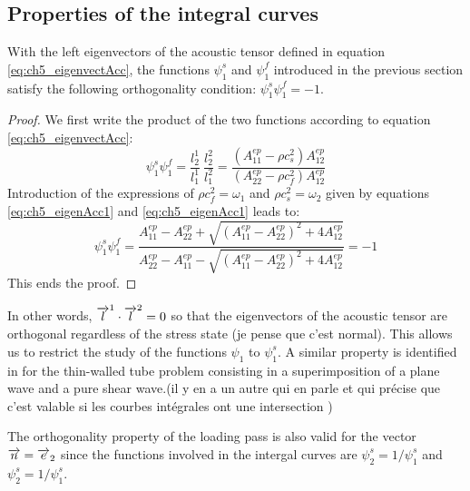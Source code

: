 \subsection{Properties of the integral curves}
With the left eigenvectors of the acoustic tensor defined in equation \eqref{eq:ch5_eigenvectAcc}, the functions $\psi^s_1$ and $\psi^f_1$ introduced in the previous section satisfy the following orthogonality condition: $\psi^s_1\psi^f_1=-1$. 

\begin{proof}
  We first write the product of the two functions according to equation \eqref{eq:ch5_eigenvectAcc}:
  \begin{equation*}
    \psi^s_1\psi^f_1 = \frac{l^1_2}{l^1_1}\: \frac{l_2^2}{l^2_1} = \frac{(A_{11}^{ep}-\rho c_s^2)A^{ep}_{12}}{(A_{22}^{ep}-\rho c_f^2)A^{ep}_{12}}
  \end{equation*}
  Introduction of the expressions of $\rho c_f^2 = \omega_1$ and $\rho c_s^2 = \omega_2$ given by equations \eqref{eq:ch5_eigenAcc1} and \eqref{eq:ch5_eigenAcc1} leads to:
  \begin{equation*}
    \psi^s_1\psi^f_1 = \frac{A_{11}^{ep}-A_{22}^{ep}+\sqrt{(A_{11}^{ep}-A_{22}^{ep})^2 + 4A_{12}^{ep}}}{A_{22}^{ep}-A_{11}^{ep}-\sqrt{(A_{11}^{ep}-A_{22}^{ep})^2 + 4A_{12}^{ep}}}=-1
  \end{equation*}
  This ends the proof.
\end{proof}
In other words, ${\overrightarrow{l}}^1 \cdot {\overrightarrow{l}}^2=0$ so that the eigenvectors of the acoustic tensor are orthogonal regardless of the stress state (je pense que c'est normal). This allows us to restrict the study of the functions $\psi_1$ to $\psi^s_1$.
A similar property is identified in \cite{Clifton} for the thin-walled tube problem consisting in a superimposition of a plane wave and a pure shear wave.(il y en a un autre qui en parle et qui précise que c'est valable si les courbes intégrales ont une intersection \cite[p.13]{Ting68})
\begin{remark}
  The orthogonality property of the loading pass is also valid for the vector ${\overrightarrow{n}}={\overrightarrow{e}}_2$ since the functions involved in the intergal curves are $\psi^s_2=1/\psi^s_1$ and $\psi^s_2=1/\psi^s_1$.
\end{remark}


